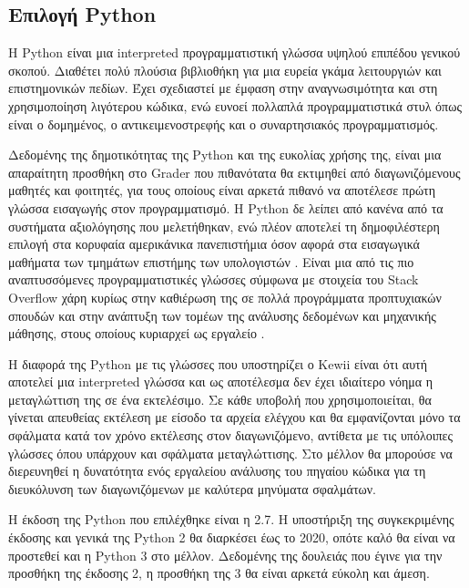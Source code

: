 \documentclass[diploma]{softlab-thesis}
\begin{document}
\subsection{Επιλογή Python}

Η Python είναι μια interpreted προγραμματιστική γλώσσα υψηλού επιπέδου γενικού
σκοπού. Διαθέτει πολύ πλούσια βιβλιοθήκη για μια ευρεία γκάμα λειτουργιών και
επιστημονικών πεδίων. Έχει σχεδιαστεί με έμφαση στην αναγνωσιμότητα και στη
χρησιμοποίηση λιγότερου κώδικα, ενώ ευνοεί πολλαπλά προγραμματιστικά στυλ όπως
είναι ο δομημένος, ο αντικειμενοστρεφής και ο συναρτησιακός προγραμματισμός.

\bigskip

Δεδομένης της δημοτικότητας της Python και της ευκολίας χρήσης της, είναι μια
απαραίτητη προσθήκη στο Grader που πιθανότατα θα εκτιμηθεί από διαγωνιζόμενους
μαθητές και φοιτητές, για τους οποίους είναι αρκετά πιθανό να αποτέλεσε πρώτη
γλώσσα εισαγωγής στον προγραμματισμό. Η Python δε λείπει από κανένα από τα
συστήματα αξιολόγησης που μελετήθηκαν, ενώ πλέον αποτελεί τη δημοφιλέστερη
επιλογή στα κορυφαία αμερικάνικα πανεπιστήμια όσον αφορά στα εισαγωγικά
μαθήματα των τμημάτων επιστήμης των υπολογιστών \cite{popularpython}.
Είναι μια από τις πιο αναπτυσσόμενες προγραμματιστικές γλώσσες σύμφωνα με
στοιχεία του Stack Overflow \cite{pythongrowth} χάρη κυρίως στην
καθιέρωση της σε πολλά προγράμματα προπτυχιακών σπουδών και στην ανάπτυξη των
τομέων της ανάλυσης δεδομένων και μηχανικής μάθησης, στους οποίους κυριαρχεί ως
εργαλείο \cite{whypython}.

\bigskip

Η διαφορά της Python με τις γλώσσες που υποστηρίζει ο Kewii είναι ότι αυτή
αποτελεί μια interpreted γλώσσα και ως αποτέλεσμα δεν έχει ιδιαίτερο νόημα η
μεταγλώττιση της σε ένα εκτελέσιμο. Σε κάθε υποβολή που χρησιμοποιείται, θα
γίνεται απευθείας εκτέλεση με είσοδο τα αρχεία ελέγχου και θα εμφανίζονται μόνο
τα σφάλματα κατά τον χρόνο εκτέλεσης στον διαγωνιζόμενο, αντίθετα με τις
υπόλοιπες γλώσσες όπου υπάρχουν και σφάλματα μεταγλώττισης. Στο μέλλον θα
μπορούσε να διερευνηθεί η δυνατότητα ενός εργαλείου ανάλυσης του πηγαίου κώδικα
για τη διευκόλυνση των διαγωνιζόμενων με καλύτερα μηνύματα σφαλμάτων.

\bigskip

Η έκδοση της Python που επιλέχθηκε είναι η 2.7. Η υποστήριξη της συγκεκριμένης
έκδοσης και γενικά της Python 2 θα διαρκέσει έως το 2020, οπότε καλό θα είναι
να προστεθεί και η Python 3 στο μέλλον. Δεδομένης της δουλειάς που έγινε για
την προσθήκη της έκδοσης 2, η προσθήκη της 3 θα είναι αρκετά εύκολη και άμεση.
\end{document}
